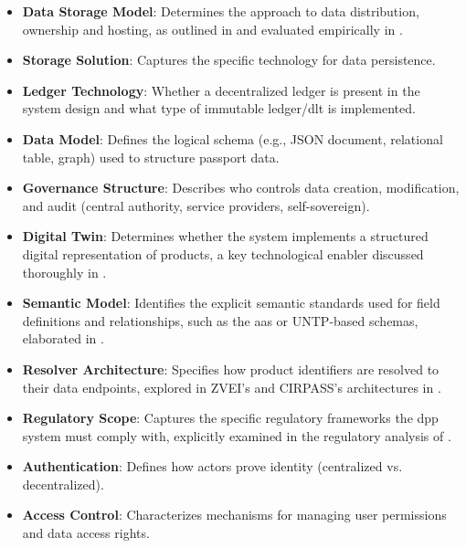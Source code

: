 \begin{itemize}
    \item \textbf{Data Storage Model}: Determines the approach to data distribution, ownership and hosting, as outlined in  and evaluated empirically in .

    \item \textbf{Storage Solution}: Captures the specific technology for data persistence.

    \item \textbf{Ledger Technology}: Whether a decentralized ledger is present in the system design and what type of immutable ledger/\ac{dlt} is implemented.

    \item \textbf{Data Model}: Defines the logical schema (e.g., JSON document, relational table, graph) used to structure passport data.

    \item \textbf{Governance Structure}: Describes who controls data creation, modification, and audit (central authority, service providers, self-sovereign).

    \item \textbf{Digital Twin}: Determines whether the system implements a structured digital representation of products, a key technological enabler discussed thoroughly in .

    \item \textbf{Semantic Model}: Identifies the explicit semantic standards used for field definitions and relationships, such as the \ac{aas} or UNTP-based schemas, elaborated in .

    \item \textbf{Resolver Architecture}: Specifies how product identifiers are resolved to their data endpoints, explored in ZVEI's and CIRPASS's architectures in .

    \item \textbf{Regulatory Scope}: Captures the specific regulatory frameworks the \ac{dpp} system must comply with, explicitly examined in the regulatory analysis of  .

    \item \textbf{Authentication}: Defines how actors prove identity (centralized vs. decentralized).

    \item \textbf{Access Control}: Characterizes mechanisms for managing user permissions and data access rights.


\end{itemize}
